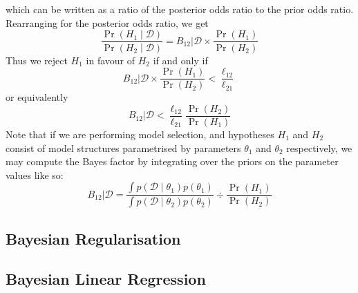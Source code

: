 \documentclass[11pt]{report} %
\begin{document}
which can be written as a ratio of the posterior odds ratio to the prior odds ratio. Rearranging for the posterior odds ratio, we get
\begin{equation}
\dfrac{\operatorname{Pr}\left(H_{1}\middle|\mathcal{D}\right)}{\operatorname{Pr}\left(H_{2}\middle|\mathcal{D}\right)} = B_{12}|\mathcal{D}\times\dfrac{\operatorname{Pr}\left(H_{1}\right)}{\operatorname{Pr}\left(H_{2}\right)}
\end{equation}
Thus we reject $H_{1}$ in favour of $H_{2}$ if and only if
\begin{equation}
B_{12}|\mathcal{D}\times \dfrac{\operatorname{Pr}\left(H_{1}\right)}{\operatorname{Pr}\left(H_{2}\right)} < \dfrac{\ell_{12}}{\ell_{21}}
\end{equation}
or equivalently
\begin{equation}
B_{12}|\mathcal{D} < \dfrac{\ell_{12}}{\ell_{21}}\dfrac{\operatorname{Pr}\left(H_{2}\right)}{\operatorname{Pr}\left(H_{1}\right)}
\end{equation}
Note that if we are performing model selection, and hypotheses $H_{1}$ and $H_{2}$ consist of model structures parametrised by parameters $\theta_{1}$ and $\theta_{2}$ respectively, we may compute the Bayes factor by integrating over the priors on the parameter values like so:
\begin{equation}
B_{12}|\mathcal{D} = \dfrac{\int p\left(\mathcal{D}\middle|\theta_{1}\right)p\left(\theta_{1}\right)}{\int p\left(\mathcal{D}\middle|\theta_{2}\right)p\left(\theta_{2}\right)} \div \dfrac{\operatorname{Pr}\left(H_{1}\right)}{\operatorname{Pr}\left(H_{2}\right)}
\end{equation}

\subsection{Bayesian Regularisation}

\subsection{Bayesian Linear Regression \cite{Rasmussen2006}}
\end{document}
